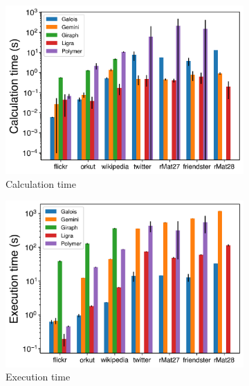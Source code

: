 \documentclass{meetings}
\begin{document}
\clearpage
\begin{figure}
	\begin{subfigure}{0.32\textwidth}
		\includegraphics[width=\linewidth]{../../plots/singleNodeBFS_calcTime.png}
		\caption{Calculation time}
		\label{fig:singleNodeBFS_calc}
	\end{subfigure}
	\hfil
	\begin{subfigure}{0.32\textwidth}
		\includegraphics[width=\linewidth]{../../plots/singleNodeBFS_execTime.png}
		\caption{Execution time}
		\label{fig:singleNodeBFS_exec}
	\end{subfigure}
	\hfil
	\begin{subfigure}{0.32\textwidth}

\end{subfigure}
\end{figure}
\end{document}
